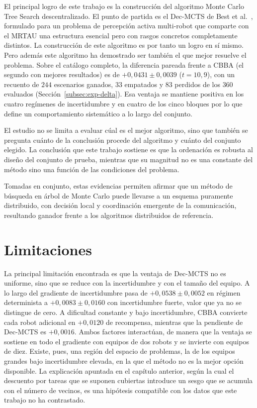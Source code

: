 El principal logro de este trabajo es la construcción del algoritmo Monte Carlo Tree Search descentralizado. El punto de partida es el Dec-MCTS de Best et al.~\cite{best2019decmcts}, formulado para un problema de percepción activa multi-robot que comparte con el MRTAU una estructura esencial pero con rasgos concretos completamente distintos. La construcción de este algoritmo es por tanto un logro en sí mismo. Pero además este algoritmo ha demostrado ser también el que mejor resuelve el problema. Sobre el catálogo completo, la diferencia pareada frente a CBBA (el segundo con mejores resultados) es de $+0{,}0431 \pm 0{,}0039$ ($t=10{,}9$), con un recuento de $244$ escenarios ganados, $33$ empatados y $83$ perdidos de los $360$ evaluados (Sección~\ref{subsec:exp-delta}). Esa ventaja se mantiene positiva en los cuatro regímenes de incertidumbre y en cuatro de los cinco bloques por lo que define un comportamiento sistemático a lo largo del conjunto.

El estudio no se limita a evaluar cúal es el mejor algoritmo, sino que también se pregunta cuánto de la conclusión procede del algoritmo y cuánto del conjunto elegido. La conclusión que este trabajo sostiene es que la ordenación es robusta al diseño del conjunto de prueba, mientras que su magnitud no es una constante del método sino una función de las condiciones del problema.

Tomadas en conjunto, estas evidencias permiten afirmar que un método de búsqueda en árbol de Monte Carlo puede llevarse a un esquema puramente distribuido, con decisión local y coordinación emergente de la comunicación, resultando ganador frente a los algoritmos distribuidos de referencia. 


\section{Limitaciones} \label{sec:conc-limitaciones}


La principal limitación encontrada es que la ventaja de Dec-MCTS no es uniforme, sino que se reduce con la incertidumbre y con el tamaño del equipo. A lo largo del gradiente de incertidumbre pasa de $+0{,}0538 \pm 0{,}0052$ en régimen determinista a $+0{,}0083 \pm 0{,}0160$ con incertidumbre fuerte, valor que ya no se distingue de cero. A dificultad constante y bajo incertidumbre, CBBA convierte cada robot adicional en $+0{,}0120$ de recompensa, mientras que la pendiente de Dec-MCTS es $+0{,}0016$. Ambos factores interactúan, de manera que la ventaja se sostiene en todo el gradiente con equipos de dos robots y se invierte con equipos de diez. Existe, pues, una región del espacio de problemas, la de los equipos grandes bajo incertidumbre elevada, en la que el método no es la mejor opción disponible. La explicación apuntada en el capítulo anterior, según la cual el descuento por tareas que se suponen cubiertas introduce un sesgo que se acumula con el número de vecinos, es una hipótesis compatible con los datos que este trabajo no ha contrastado.

